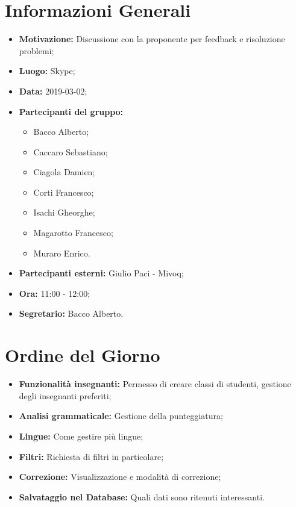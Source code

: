 \documentclass[a4paper, oneside, openany, dvipsnames, table]{article}
\begin{document}
\copertina{}


\newpage
\tableofcontents
\newpage
\section{Informazioni Generali}
\begin{itemize}
\item \textbf{Motivazione:} Discussione con la proponente per feedback e risoluzione problemi;
\item \textbf{Luogo:} Skype;
\item \textbf{Data:} 2019-03-02;
\item \textbf{Partecipanti del gruppo:} \hfill
	\begin{itemize}
	\item Bacco Alberto;
	\item Caccaro Sebastiano;
	\item Ciagola Damien;
	\item Corti Francesco;
	\item Isachi Gheorghe;
	\item Magarotto Francesco;
	\item Muraro Enrico.
	\end{itemize} 
\item \textbf{Partecipanti esterni:} Giulio Paci - Mivoq;
\item \textbf{Ora:} 11:00 - 12:00;
\item \textbf{Segretario:} Bacco Alberto.
\end{itemize}

\section{Ordine del Giorno}
\begin{itemize}
	\item \textbf{Funzionalità insegnanti:} Permesso di creare classi di studenti, gestione degli insegnanti preferiti;
	\item \textbf{Analisi grammaticale:} Gestione della punteggiatura;
	\item \textbf{Lingue:} Come gestire più lingue;
	\item \textbf{Filtri:} Richiesta di filtri in particolare;
	\item \textbf{Correzione:} Visualizzazione e modalità di correzione;
	\item \textbf{Salvataggio nel Database:} Quali dati sono ritenuti interessanti.
\end{itemize}
\end{document}
